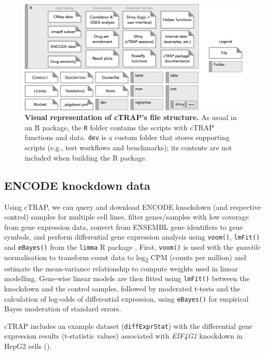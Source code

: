 \begin{figure}[!ht]
  \includegraphics[width=1\textwidth]{images/ctrap/file-structure}
  \centering
  \caption[cTRAP file structure]{\textbf{Visual representation of cTRAP's file structure.} As usual in an R package, the \texttt{R} folder contains the scripts with cTRAP functions and data. \texttt{dev} is a custom folder that stores supporting scripts (e.g., test workflows and benchmarks); its contents are not included when building the R package.}
  \label{fig:ctrap-file-structure}
\end{figure}

\subsection{ENCODE knockdown data}

Using cTRAP, we can query and download ENCODE knockdown (and respective control) samples \cite{luo:2019tp} for multiple cell lines, filter genes/samples with low coverage from gene expression data, convert from ENSEMBL gene identifiers to gene symbols, and perform differential gene expression analysis using \texttt{voom()}, \texttt{lmFit()} and \texttt{eBayes()} from the \texttt{limma} R package \cite{ritchie:2015tm}. First, \texttt{voom()} is used with the \emph{quantile} normalisation to transform count data to log\textsubscript{2} CPM (counts per million) and estimate the mean-variance relationship to compute weights used in linear modelling. Gene-wise linear models are then fitted using \texttt{lmFit()} between the knockdown and the control samples, followed by moderated t-tests and the calculation of log-odds of differential expression, using \texttt{eBayes()} for empirical Bayes moderation of standard errors.

cTRAP includes an example dataset (\texttt{diffExprStat}) with the differential gene expression results (t-statistic values) associated with \emph{EIF4G1} knockdown in HepG2 cells ().

